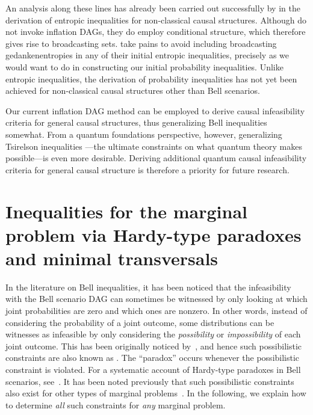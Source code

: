An analysis along these lines has already been carried out successfully by \citet{Chaves2015infoquantum} in the derivation of entropic inequalities for non-classical causal structures. Although \citet{Chaves2015infoquantum} do not invoke inflation DAGs, they do employ conditional structure, which therefore gives rise to broadcasting sets. \citet{Chaves2015infoquantum} take pains to avoid including broadcasting gedankenentropies in any of their initial entropic inequalities, precisely as we would want to do in constructing our initial probability inequalities. Unlike entropic inequalities, the derivation of probability inequalities has not yet been achieved for non-classical causal structures other than Bell scenarios. 

Our current inflation DAG method can be employed to derive causal infeasibility criteria for general causal structures, thus generalizing Bell inequalities somewhat. From a quantum foundations perspective, however, generalizing Tsirelson inequalities \cite{Tsirelson1980,Brunner2013Bell}---the ultimate constraints on what quantum theory makes possible---is even more desirable. Deriving additional quantum causal infeasibility criteria for general causal structure is therefore a priority for future research. 

\section{Inequalities for the marginal problem via Hardy-type paradoxes and minimal transversals}\label{sec:TSEM}

In the literature on Bell inequalities, it has been noticed that the infeasibility with the Bell scenario DAG can sometimes be witnessed by only looking at which joint probabilities are zero and which ones are nonzero. In other words, instead of considering the probability of a joint outcome, some distributions can be witnesses as infeasible by only considering the \emph{possibility} or \emph{impossibility} of each joint outcome. This has been originally noticed by~\citet{L.Hardy:PRL:1665}, and hence such possibilistic constraints are also known as . The ``paradox'' occurs whenever the possibilistic constraint is violated. For a systematic account of Hardy-type paradoxes in Bell scenarios, see~\cite{Mansfield2012}. It has been noted previously that such possibilistic constraints also exist for other types of marginal problems~\cite[Section~III.C]{LSW}. In the following, we explain how to determine \emph{all} such constraints for \emph{any} marginal problem.

